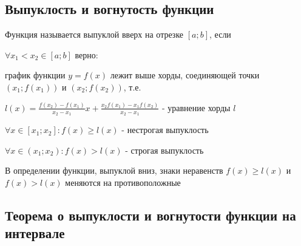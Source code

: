 
\subsection{Выпуклость и вогнутость функции}

{
    Функция называется выпуклой вверх на отрезке $[a; b]$, если

    $ \forall x_1 < x_2 \in [a; b] $ верно:

    график функции $y=f(x)$ лежит выше хорды, соединяющей точки $(x_1; f(x_1))$ и $(x_2; f(x_2))$, т.е.

    $ l(x) = \frac{f(x_2) - f(x_1)}{x_2 - x_1} x + \frac{x_2 f(x_1) - x_1 f(x_2)}{x_2 - x_1} $ - уравнение хорды $l$

    $ \forall x \in [x_1; x_2]: f(x) \ge l(x) $ - нестрогая выпуклость

    $ \forall x \in (x_1; x_2): f(x) > l(x) $ - строгая выпуклость

    В определении функции, выпуклой вниз, знаки неравенств $ f(x) \ge l(x) $ и $ f(x) > l(x) $ меняются на противоположные
}

\subsection{Теорема о выпуклости и вогнутости функции на интервале}

